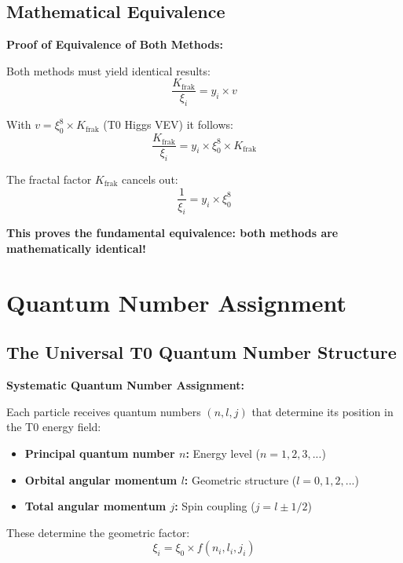 \documentclass[12pt,a4paper]{article}
\begin{document}
	\subsection{Mathematical Equivalence}
	
	\begin{equivalence}
		\textbf{Proof of Equivalence of Both Methods:}
		
		Both methods must yield identical results:
		\begin{equation}
			\frac{K_{\text{frak}}}{\xi_i} = y_i \times v
		\end{equation}
		
		With $v = \xi_0^8 \times K_{\text{frak}}$ (T0 Higgs VEV) it follows:
		\begin{equation}
			\frac{K_{\text{frak}}}{\xi_i} = y_i \times \xi_0^8 \times K_{\text{frak}}
		\end{equation}
		
		The fractal factor $K_{\text{frak}}$ cancels out:
		\begin{equation}
			\frac{1}{\xi_i} = y_i \times \xi_0^8
		\end{equation}
		
		\textbf{This proves the fundamental equivalence: both methods are mathematically identical!}
	\end{equivalence}
	
	\section{Quantum Number Assignment}
	
	\subsection{The Universal T0 Quantum Number Structure}
	
	\begin{method}
		\textbf{Systematic Quantum Number Assignment:}
		
		Each particle receives quantum numbers $(n,l,j)$ that determine its position in the T0 energy field:
		
		\begin{itemize}
			\item \textbf{Principal quantum number $n$:} Energy level ($n = 1,2,3,...$)
			\item \textbf{Orbital angular momentum $l$:} Geometric structure ($l = 0,1,2,...$)
			\item \textbf{Total angular momentum $j$:} Spin coupling ($j = l \pm 1/2$)
		\end{itemize}
		
		These determine the geometric factor:
		\begin{equation}
			\xi_i = \xi_0 \times f(n_i, l_i, j_i)
		\end{equation}
	\end{method}
	
\end{document}
